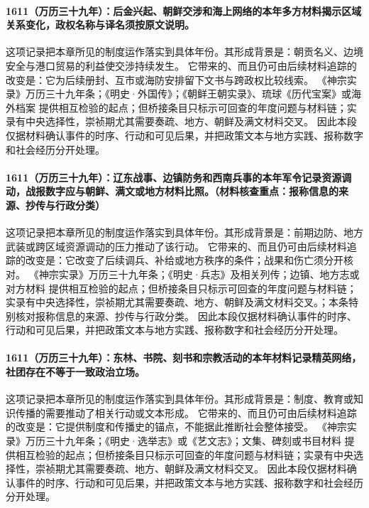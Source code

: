 \paragraph{1611（万历三十九年）：后金兴起、朝鲜交涉和海上网络的本年多方材料揭示区域关系变化，政权名称与译名须按原文说明。} 这项记录把本章所见的制度运作落实到具体年份。其形成背景是：朝贡名义、边境安全与港口贸易的利益使交涉持续发生。 它带来的、而且仍可由后续材料追踪的改变是：它为后续册封、互市或海防安排留下文书与跨政权比较线索。 《神宗实录》万历三十九年条；《明史·外国传》；《朝鲜王朝实录》、琉球《历代宝案》或海外档案 提供相互检验的起点；但桥接条目只标示可回查的年度问题与材料链；实录有中央选择性，崇祯期尤其需要奏疏、地方、朝鲜及满文材料交叉。 因此本段仅据材料确认事件的时序、行动和可见后果，并把政策文本与地方实践、报称数字和社会经历分开处理。

\paragraph{1611（万历三十九年）：辽东战事、边镇防务和西南兵事的本年军令记录资源调动，战报数字应与朝鲜、满文或地方材料比照。（材料核查重点：报称信息的来源、抄传与行政分类）} 这项记录把本章所见的制度运作落实到具体年份。其形成背景是：前期边防、地方武装或跨区域资源调动的压力推动了该行动。 它带来的、而且仍可由后续材料追踪的改变是：它改变了后续调兵、补给或地方秩序的条件；战果和伤亡须分开核对。 《神宗实录》万历三十九年条；《明史·兵志》及相关列传；边镇、地方志或对方材料 提供相互检验的起点；但桥接条目只标示可回查的年度问题与材料链；实录有中央选择性，崇祯期尤其需要奏疏、地方、朝鲜及满文材料交叉。；本条特别核对报称信息的来源、抄传与行政分类。 因此本段仅据材料确认事件的时序、行动和可见后果，并把政策文本与地方实践、报称数字和社会经历分开处理。

\paragraph{1611（万历三十九年）：东林、书院、刻书和宗教活动的本年材料记录精英网络，社团存在不等于一致政治立场。} 这项记录把本章所见的制度运作落实到具体年份。其形成背景是：制度、教育或知识传播的需要推动了相关行动或文本形成。 它带来的、而且仍可由后续材料追踪的改变是：它提供制度和传播史的锚点，不能据此推断社会整体接受。 《神宗实录》万历三十九年条；《明史·选举志》或《艺文志》；文集、碑刻或书目材料 提供相互检验的起点；但桥接条目只标示可回查的年度问题与材料链；实录有中央选择性，崇祯期尤其需要奏疏、地方、朝鲜及满文材料交叉。 因此本段仅据材料确认事件的时序、行动和可见后果，并把政策文本与地方实践、报称数字和社会经历分开处理。

